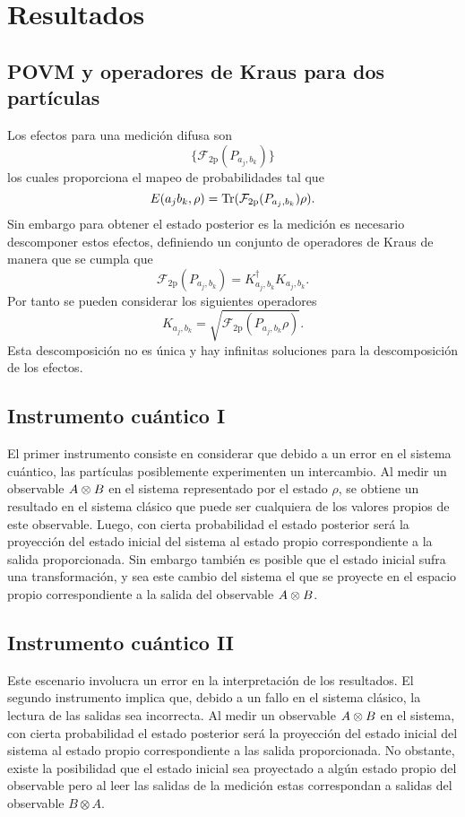 \documentclass[12pt,letterpaper]{book}\raggedbottom{}
\begin{document}
\section{Resultados}

\subsection{POVM y operadores de Kraus para dos partículas}
Los efectos para una medición difusa son \[\{\mathcal{F}_{2\text{p}}(P_{a_j,b_k})\}\]los cuales proporciona el mapeo de probabilidades tal que \[   E(a_j b_k, \rho)= {\rm Tr}(\mathcal{F}_{2\text{p}}({P_{a_j,b_k}})\rho).\] Sin embargo para obtener el estado posterior es la medición es necesario descomponer estos efectos, definiendo un conjunto de operadores de Kraus de manera que se cumpla que \[\mathcal{F}_{2\text{p}}(P_{a_j,b_k})=K_{a_j,b_k}^\dagger K_{a_j,b_k}.\] Por tanto se pueden considerar los siguientes operadores \[K_{a_j,b_k}=\sqrt{\mathcal{F}_{2\text{p}}(P_{a_j,b_k}\rho)}.\] Esta descomposición no es única y hay infinitas soluciones para la descomposición de los efectos.



\subsection{Instrumento cuántico I}

El primer instrumento consiste en considerar que debido a un error en el
sistema cuántico, las partículas posiblemente experimenten un intercambio. Al
medir un observable ${A \otimes B}$ en el sistema representado por el estado
$\rho$, se obtiene un resultado  en el sistema clásico que puede ser cualquiera
de los valores propios de este observable. Luego, con cierta probabilidad el
estado posterior será la proyección del estado inicial del sistema al estado
propio correspondiente a la salida proporcionada. Sin embargo también es
posible que el estado inicial sufra una transformación, y sea este cambio del
sistema el que se proyecte en el espacio propio correspondiente a la salida del
observable $A\otimes B$.

\subsection{Instrumento cuántico II}

Este escenario involucra un error en la interpretación de los resultados. El segundo instrumento implica que, debido a un fallo en el sistema clásico, la lectura de las salidas sea incorrecta. Al medir un observable ${A \otimes B}$ en el sistema, con cierta probabilidad el estado posterior será la proyección del estado inicial del sistema al estado propio correspondiente a las salida proporcionada. No obstante, existe la posibilidad que el estado inicial sea proyectado a algún estado propio del observable pero al leer las salidas de la medición estas correspondan a salidas del observable $B\otimes A$.
\end{document}

